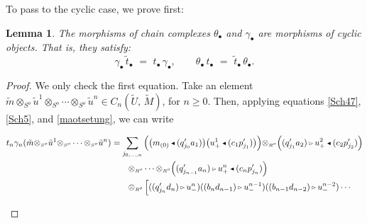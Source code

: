 \documentclass[reqno, a4paper, 10pt]{amsart}
\numberwithin{equation}{section}
\theoremstyle{plain}
\newtheorem{lemma}[theorem]{Lemma}
\theoremstyle{definition}
\theoremstyle{remark}
\begin{document}
To pass to the cyclic case, we prove first:
\begin{lemma}
\label{Lemma:tgamma}
The morphisms of chain complexes $\theta_{{\scriptscriptstyle{\bullet}}}$ and $\gamma_{{\scriptscriptstyle{\bullet}}}$ are morphisms of cyclic objects. That is, they satisfy:
$$ \gamma_{{\scriptscriptstyle{\bullet}}} \, {\tilde{{t}}}_{{\scriptscriptstyle{\bullet}}}\,\,=\,\, t_{{\scriptscriptstyle{\bullet}}} \, \gamma_{{\scriptscriptstyle{\bullet}}},\qquad 
\theta_{{\scriptscriptstyle{\bullet}}} \, t_{{\scriptscriptstyle{\bullet}}}\,\,=\,\, {\tilde{{t}}}_{{\scriptscriptstyle{\bullet}}} \, \theta_{{\scriptscriptstyle{\bullet}}}.$$
\end{lemma}
\begin{proof}
We only check the first equation. 
Take an element 
${\tilde{{m}}}{\otimes_{\scriptscriptstyle{{\scriptscriptstyle{{S^{o}}}}}}}{\tilde{{u}}}^1 {\otimes_{\scriptscriptstyle{{\scriptscriptstyle{{S^{o}}}}}}}\cdots{\otimes_{\scriptscriptstyle{{\scriptscriptstyle{{S^{o}}}}}}} {\tilde{{u}}}^n \in C_n({\tilde{{U}}},\, {\tilde{{M}}})$, for $n \geq 0$. Then, applying equations \eqref{Sch47}, \eqref{Sch5}, and \eqref{maotsetung}, we can write
\begin{footnotesize}
\begin{equation*}
\begin{split}
t_n \gamma_n({\tilde{{m}}}{\otimes_{\scriptscriptstyle{{\scriptscriptstyle{{S^{o}}}}}}}{\tilde{{u}}}^1 {\otimes_{\scriptscriptstyle{{\scriptscriptstyle{{S^{o}}}}}}}\cdots{\otimes_{\scriptscriptstyle{{\scriptscriptstyle{{S^{o}}}}}}} {\tilde{{u}}}^n)
 &=  \sum_{j_{0,\ldots,n}} \Big( {\big( {m_{(0)}{{\,\raise1pt\hbox{$\scriptscriptstyle{\blacktriangleleft}$} \, }} (q_{j_0}'a_1)} \big)}{\big( {u_{+}^1 {{\,\raise1pt\hbox{$\scriptscriptstyle{\blacktriangleleft}$} \, }} (c_1p_{j_1}')} \big)}\Big) {\otimes_{\scriptscriptstyle{{\scriptscriptstyle{{R^{o}}}}}}} \Big( (q_{j_1}'a_2){{\,\raise1pt\hbox{$\scriptscriptstyle{\rhd}$} \, }} u_{+}^2 {{\,\raise1pt\hbox{$\scriptscriptstyle{\blacktriangleleft}$} \, }} (c_2p_{j_2}')\Big) \\ 
& \qquad
{\otimes_{\scriptscriptstyle{{\scriptscriptstyle{{R^{o}}}}}}} \cdots{\otimes_{\scriptscriptstyle{{\scriptscriptstyle{{R^{o}}}}}}}\Big((q_{j_{n-1}}'a_n) {{\,\raise1pt\hbox{$\scriptscriptstyle{\rhd}$} \, }} u_{+}^n {{\,\raise1pt\hbox{$\scriptscriptstyle{\blacktriangleleft}$} \, }} (c_np_{j_n}')\Big) \\ 
& \qquad
  {\otimes_{\scriptscriptstyle{{\scriptscriptstyle{{R^{o}}}}}}}\left[\underset{}{} ((q_{j_n}'d_n) {{\,\raise1pt\hbox{$\scriptscriptstyle{\rhd}$} \, }} u^n_{-})((b_nd_{n-1}) {{\,\raise1pt\hbox{$\scriptscriptstyle{\rhd}$} \, }} u^{n-1}_{-}) ((b_{n-1}d_{n-2}) {{\,\raise1pt\hbox{$\scriptscriptstyle{\rhd}$} \, }} u^{n-2}_{-}) \cdots \right. \\ 

\end{split}
\end{equation*}
\end{footnotesize}
\end{proof}
\end{document}
